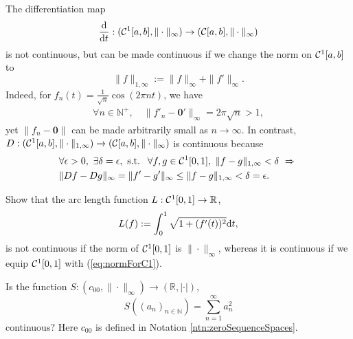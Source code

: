 \begin{exm}
  \label{exm:continuityOfDifferentiation}
  The differentiation map
  \begin{displaymath}
    \frac{\mathrm{d}}{\mathrm{d} t}:
    ({\cal C}^1[a,b],\|\cdot\|_{\infty})
    \rightarrow ({\cal C}[a,b], \|\cdot\|_{\infty})
  \end{displaymath}
  is not continuous, but can be made
  continuous if we change the norm on ${\cal C}^1[a,b]$ to
  \begin{equation}
    \label{eq:normForC1}
    \|f\|_{1,\infty}:= \|f\|_{\infty} + \|f'\|_{\infty}.
  \end{equation}
  Indeed,
  for $f_n(t) = \frac{1}{\sqrt{n}}\cos(2\pi nt)$,
  we have
  \begin{align*}
    \forall n\in \mathbb{N}^+,\quad
    \|f'_n-\mathbf{0}'\|_{\infty} = 2\pi\sqrt{n} > 1, 
  \end{align*}
  yet $\|f_n-\mathbf{0}\|$ can be made arbitrarily small
  as $n \rightarrow \infty$.
  In contrast,
  $D: ({\cal C}^1[a,b],\|\cdot\|_{1,\infty})
  \rightarrow ({\cal C}[a,b], \|\cdot\|_{\infty})$ is continuous because
  \begin{align*}
    &\forall \epsilon>0,\ \exists \delta=\epsilon, \text{ s.t. }\ 
      \forall f,g\in {\cal C}^1[0,1],\ 
      \|f - g\|_{1,\infty}<\delta
    \ \Rightarrow\ 
    \\
    &
    \|Df - Dg\|_{\infty}
    = \|f' - g'\|_{\infty} \le
    \|f - g\|_{1,\infty} < \delta=\epsilon.
  \end{align*}
\end{exm}

\begin{exc}
  \label{exc:arcLengthFunctionNotContinuous}
  Show that the arc length function $L: {\cal C}^1[0,1]\rightarrow\mathbb{R}$,
  \begin{equation}
    \label{eq:arcLengthFunction}
    L(f) := \int_0^1 \sqrt{1+(f'(t))^2} \mathrm{d} t,
  \end{equation}
  is not continuous if the norm of ${\cal C}^1[0,1]$ is
  $\|\cdot\|_{\infty}$,
  whereas it is continuous if we equip ${\cal C}^1[0,1]$ with
  (\ref{eq:normForC1}).
\end{exc}

\begin{exc}
  Is the function
  $S: (c_{00}, \|\cdot\|_{\infty}) \rightarrow (\mathbb{R}, |\cdot|)$,
  \begin{equation}
    \label{eq:c00FuncNotCont}
    S\left((a_n)_{n\in \mathbb{N}}\right) = \sum_{n=1}^{\infty} a_n^2
  \end{equation}
  continuous?
  Here $c_{00}$ is defined in Notation \ref{ntn:zeroSequenceSpaces}. 
\end{exc}

